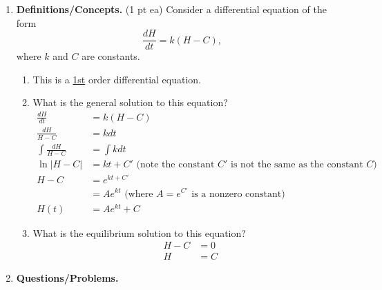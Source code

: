\documentclass[11pt,letterpaper]{article}
\begin{document}
\begin{enumerate}
\item  \textbf{Definitions/Concepts.} (1 pt ea) Consider a differential equation of the form
\[\frac{dH}{dt}=k(H-C),\]
where $k$ and $C$ are constants.
\begin{enumerate}
\item This is a \underline{\hspace{3ex}1st\hspace{4ex}} order differential equation.

\vspace{1pc}
\item What is the general solution to this equation?
\begin{align*}
\frac{dH}{dt} &=k(H-C) \\
\frac{dH}{H-C} &=kdt \\
\int\frac{dH}{H-C} &=\int kdt \\
\ln{|H-C|} &=kt+C' \text{ (note the constant $C'$ is not the same as the constant $C$)} \\
H-C &= e^{kt+C'} \\
&= Ae^{kt} \text{ (where $A=e^{C'}$ is a nonzero constant)} \\
H(t) &= Ae^{kt}+C
\end{align*}

\vspace{1pc}
\item What is the equilibrium solution to this equation?
\begin{align*}
H-C &= 0 \\
H &= C 
\end{align*}

\vspace{1pc}
\end{enumerate}
 
\item \textbf{Questions/Problems.} 


\end{enumerate}
\end{document}
